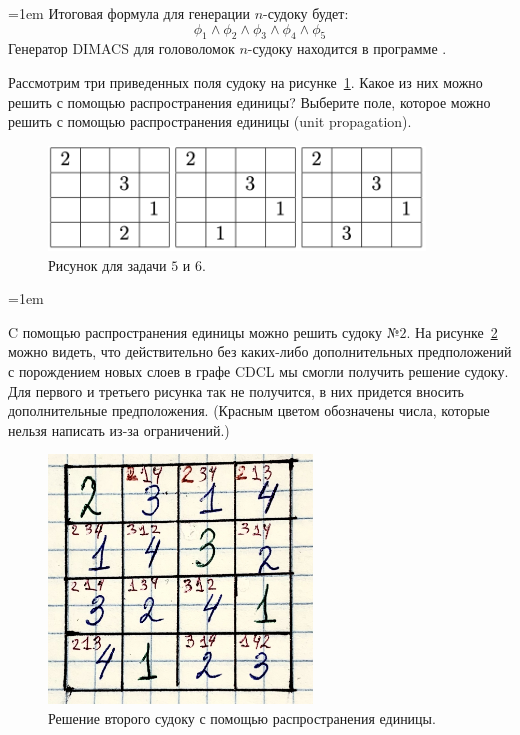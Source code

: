 \documentclass[12pt]{extreport}
\theoremstyle{definiton}
\theoremstyle{definition}
\theoremstyle{definition}
\newcommand{\solution}[2][\color{myblue}Решение]{
\medskip
	\noindent{\bfseries #1 }{{\color{myblue}\bfseries #2:}}
}
\newenvironment{blockquote}{%
  \par%
  \medskip
  \leftskip=1em%
  \noindent}{%
  \par\medskip}
\begin{document}
\begin{blockquote}
{\noindent Итоговая формула для генерации $n$-судоку будет:
$$\phi_{1} \wedge \phi_{2} \wedge \phi_{3} \wedge \phi_{4} \wedge \phi_{5}$$
Генератор DIMACS для головоломок $n$-судоку находится в программе {}.
}
\end{blockquote}



\Pr[5 баллов] Рассмотрим три приведенных поля судоку на рисунке~\ref{ris:sudoku}. Какое из них можно решить с помощью распространения единицы? Выберите поле, которое можно решить с помощью распространения единицы (unit propagation).
\begin{figure}[H]
    \centering
    \includegraphics[width=10.0cm]{images/sudoku.png}
    \caption{Рисунок для задачи $5$ и $6$.}
    \label{ris:sudoku}
\end{figure}

\solution{5}
\begin{blockquote}
{\color{myblue}
\noindent C помощью распространения единицы можно решить судоку №$2$. На рисунке~\ref{ris:sudoku_unit} можно видеть, что действительно без каких-либо дополнительных предположений с порождением новых слоев в графе CDCL мы смогли получить решение судоку. Для первого и третьего рисунка так не получится, в них придется вносить дополнительные предположения. (Красным цветом обозначены числа, которые нельзя написать из-за ограничений.) 
\begin{figure}[H]
    \centering
    \includegraphics[width=7.0cm]{images/sudoku_unit.JPG}
    \caption{Решение второго судоку с помощью распространения единицы.}
    \label{ris:sudoku_unit}
\end{figure}
}
\end{blockquote}
\end{document}
